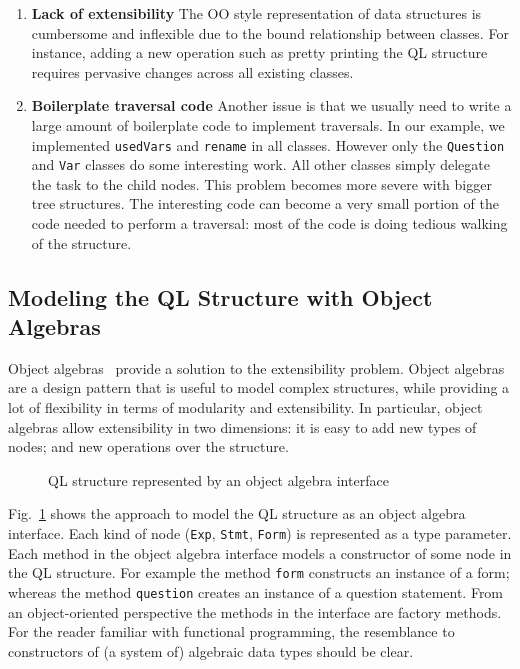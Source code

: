 \begin{enumerate}

\item {\bf Lack of extensibility} The OO style
  representation of data structures is cumbersome and
  inflexible due to the bound relationship between classes. For
  instance, adding a new operation such as pretty
  printing the QL structure requires pervasive changes across all
  existing classes.

\item {\bf Boilerplate traversal code} Another issue is that we
  usually need to write a large amount of boilerplate code to
  implement traversals. In our example, we implemented
  \lstinline{usedVars} and \lstinline{rename} in all
  classes. However only the \lstinline{Question} and \lstinline{Var} classes do some
  interesting work. All other classes simply delegate the task to the
  child nodes. This problem becomes more severe with bigger tree
  structures. The interesting code can become a very small portion of
  the code needed to perform a traversal: most of the code is doing
  tedious walking of the structure.

\end{enumerate}

\subsection{Modeling the QL Structure with Object Algebras}\label{subsec:model_ql_with_oa}

Object algebras~\cite{bruno12oa} provide a solution to the extensibility problem.
Object algebras are a design pattern that is useful to model complex
structures, while providing a lot of flexibility in terms of
modularity and extensibility. In particular, object algebras allow
extensibility in two dimensions: it is easy to add new types of
nodes; and new operations over the structure.

\begin{figure}[t]
\nocaptionrule
\caption{QL structure represented by an object algebra interface}
\label{ql_tree}
\end{figure}

Fig.~\ref{ql_tree} shows the approach to model the QL
structure as an object algebra interface. Each kind of node (\lstinline{Exp}, \lstinline{Stmt}, \lstinline{Form})
is represented as a type parameter. Each method in the object algebra interface models a
constructor of some node in the QL structure. For example the
method \lstinline{form} constructs an instance of a form; whereas the
method \lstinline{question} creates an instance of a question statement. From an
object-oriented perspective the methods in the interface are factory
methods. For the reader familiar with functional programming, the
resemblance to constructors of  (a system of) algebraic data types should be clear.


